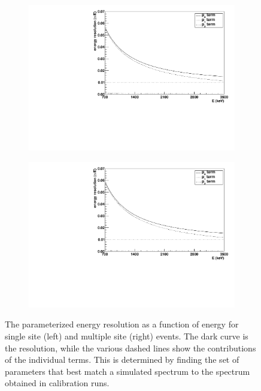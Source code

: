 \documentclass[herrin-thesis.tex]{subfiles}
\begin{document}
\begin{figure}[tbp]
\centering
	\begin{subfigure}[b]{0.48\textwidth}
	\centering
	\includegraphics[width=\textwidth]{./plots/analysis_resolution_ss.pdf}
	\end{subfigure}\hfill%
	\begin{subfigure}[b]{0.48\textwidth}
	\centering
	\includegraphics[width=\textwidth]{./plots/analysis_resolution_ms.pdf}
	\end{subfigure}
\caption[Parameterized energy resolution functions]{The parameterized energy resolution as a function of energy for single site (left) and multiple site (right) events. The dark curve is the resolution, while the various dashed lines show the contributions of the individual terms. This is determined by finding the set of parameters that best match a simulated spectrum to the spectrum obtained in calibration runs.}
\label{fig:analysis_resolution}
\end{figure}
\end{document}
